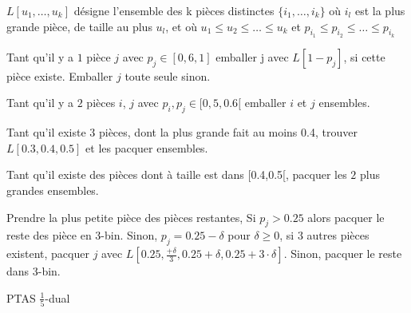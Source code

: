 \documentclass[a4paper,12pt]{report}
\theoremstyle{plain}				%
\theoremstyle{definition}				%
\begin{document}
$L[u_1, \ldots, u_k]$ désigne l'ensemble des
k pièces distinctes $\{i_1, \ldots, i_k\}$
où $i_l$ est la plus grande pièce, de taille au plus $u_l$,
et où $u_1 \leq u_2 \leq \ldots \leq u_k$ et
$p_{i_1} \leq p_{i_2} \leq \ldots \leq p_{i_k}$


\begin{algorithm}[H]
\DontPrintSemicolon

Tant qu'il y a $1$ pièce $j$ avec $p_j \in [0,6, 1]$ emballer j avec
$L[1 - p_j]$, si cette pièce existe.
Emballer $j$ toute seule sinon.

\BlankLine %
Tant qu'il y a $2$ pièces $i$, $j$ avec $p_i, p_j \in [0,5, 0.6[$
emballer $i$ et $j$ ensembles.

\BlankLine %
Tant qu'il existe $3$ pièces, dont la plus grande fait au moins 0.4,
trouver $L[0.3,0.4,0.5]$ et les pacquer ensembles.

\BlankLine %
Tant qu'il existe des pièces dont à taille est dans [0.4,0.5[, pacquer
les $2$ plus grandes ensembles.

\BlankLine %
Prendre la plus petite pièce des pièces restantes, Si $p_j > 0.25$
alors pacquer le reste des pièce en 3-bin.
Sinon, $p_j = 0.25 - \delta$ pour $\delta \geq 0$,
 si $3$ autres pièces existent, pacquer $j$
 avec $L[0.25, \frac{+\delta}{3}, 0.25 + \delta, 0.25 + 3 \cdot \delta]$.
Sinon, pacquer le reste dans 3-bin.


\caption{PTAS $\frac{1}{5}$-dual}
\label{algo:PTASDual1_5}
\end{algorithm}

\bigskip
\end{document}
